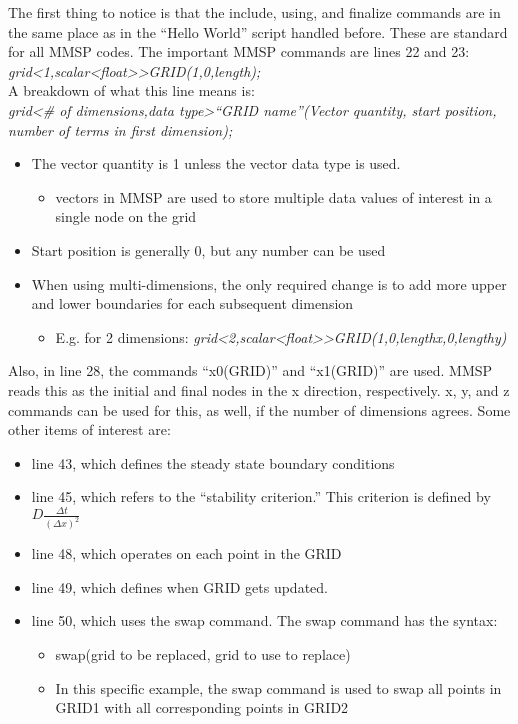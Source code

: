 \documentclass{article}
\begin{document}
The first thing to notice is that the include, using, and finalize commands are in the same place as in the “Hello World” script handled before.  These are standard for all MMSP codes.  The important MMSP commands are lines 22 and 23:
\\ 	\textit{grid\textless 1,scalar\textless float\textgreater \textgreater GRID(1,0,length);}
\\A breakdown of what this line means is:
\\ 	\textit{grid\textless \# of dimensions,data type\textgreater “GRID name”(Vector quantity, start position, number of terms in first dimension);}
\\ \begin{itemize} \itemsep1pt \parskip0pt 
\item The vector quantity is 1 unless the vector data type is used.
\begin{itemize} \itemsep1pt \parskip0pt 
\item vectors in MMSP are used to store multiple data values of interest in a single node on the grid
\end{itemize}
\item Start position is generally 0, but any number can be used
\item When using multi-dimensions, the only required change is to add more upper and lower boundaries for each subsequent dimension
\begin{itemize} \itemsep1pt \parskip0pt 
\item E.g. for 2 dimensions: \textit{grid\textless 2,scalar\textless float\textgreater \textgreater GRID(1,0,lengthx,0,lengthy)}
\end{itemize}
\end{itemize}
Also, in line 28, the commands “x0(GRID)” and “x1(GRID)” are used. MMSP reads this as the initial and final nodes in the x direction, respectively. x, y, and z commands can be used for this, as well, if the number of dimensions agrees.
Some other items of interest are:
\begin{itemize} \itemsep1pt \parskip0pt 
\item line 43, which defines the steady state boundary conditions
\item line 45, which refers to the “stability criterion.” This criterion is defined by $D\frac{\Delta t}{(\Delta x)^2}$
\item line 48, which operates on each point in the GRID
\item line 49, which defines when GRID gets updated.
\item line 50, which uses the swap command. The swap command has the syntax:
\begin{itemize} \itemsep1pt \parskip0pt 
\item swap(grid to be replaced, grid to use to replace)
\item In this specific example, the swap command is used to swap all points in GRID1 with all corresponding points in GRID2
\end{itemize}
\end{itemize}
\end{document}
